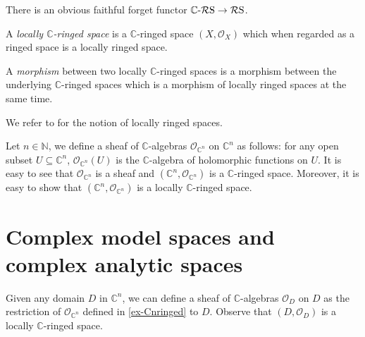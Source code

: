 There is an obvious faithful forget functor $\mathbb{C}\text{-}\mathcal{R}\mathrm{S}\rightarrow \mathcal{R}\mathrm{S}$.

\begin{definition}
    A \emph{locally $\mathbb{C}$-ringed space} is a $\mathbb{C}$-ringed space $(X,\mathcal{O}_X)$ which when regarded as a ringed space is a locally ringed space.

    A \emph{morphism} between two locally $\mathbb{C}$-ringed spaces is a morphism between the underlying $\mathbb{C}$-ringed spaces which is a morphism of locally ringed spaces at the same time.
\end{definition}
We refer to \cite[\href{https://stacks.math.columbia.edu/tag/01HA}{Tag 01HA}]{stacks-project} for the notion of locally ringed spaces.

\begin{example}\label{ex-Cnringed}
    Let $n\in \mathbb{N}$, we define a sheaf of $\mathbb{C}$-algebras $\mathcal{O}_{\mathbb{C}^n}$ on $\mathbb{C}^n$ as follows: for any open subset $U\subseteq \mathbb{C}^n$, $\mathcal{O}_{\mathbb{C}^n}(U)$ is the $\mathbb{C}$-algebra of holomorphic functions on $U$. It is easy to see that $\mathcal{O}_{\mathbb{C}^n}$ is a sheaf and $(\mathbb{C}^n,\mathcal{O}_{\mathbb{C}^n})$ is a $\mathbb{C}$-ringed space. Moreover, it is easy to show that $(\mathbb{C}^n,\mathcal{O}_{\mathbb{C}^n})$ is a locally $\mathbb{C}$-ringed space.
\end{example}

\section{Complex model spaces and complex analytic spaces}



\begin{definition}\label{def-sheafondomain}
Given any domain $D$ in $\mathbb{C}^n$, we can define a sheaf of $\mathbb{C}$-algebras $\mathcal{O}_D$ on $D$ as the restriction of $\mathcal{O}_{\mathbb{C}^n}$ defined in \cref{ex-Cnringed} to $D$. Observe that $(D,\mathcal{O}_D)$ is a locally $\mathbb{C}$-ringed space. 
\end{definition}


